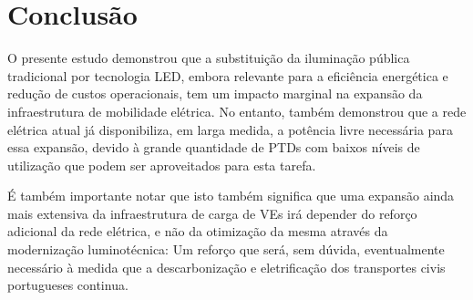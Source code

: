 \documentclass[conference]{IEEEtran}
\begin{document}
\section{Conclusão}

O presente estudo demonstrou que a substituição da iluminação pública tradicional por tecnologia LED, embora relevante para a eficiência energética e redução de custos operacionais, tem um impacto marginal na expansão da infraestrutura de mobilidade elétrica. No entanto, também demonstrou que a rede elétrica atual já disponibiliza, em larga medida, a potência livre necessária para essa expansão, devido à grande quantidade de PTDs com baixos níveis de utilização que podem ser aproveitados para esta tarefa.

É também importante notar que isto também significa que uma expansão ainda mais extensiva da infraestrutura de carga de VEs irá depender do reforço adicional da rede elétrica, e não da otimização da mesma através da modernização luminotécnica: Um reforço que será, sem dúvida, eventualmente necessário à medida que a descarbonização e eletrificação dos transportes civis portugueses continua.
\end{document}
